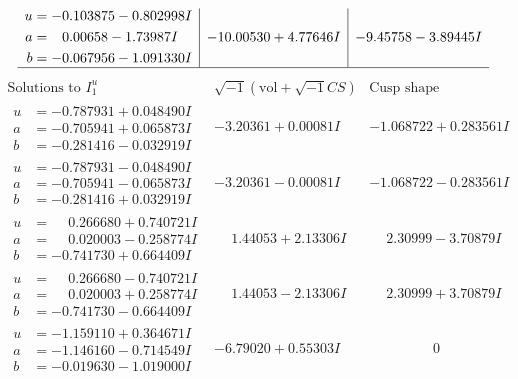 \documentclass[1p]{elsarticle_modified}
\theoremstyle{definition}
\newcommand{\I}{\sqrt{-1}}
\begin{document}
$$\begin{array}{c|c|c}
\begin{aligned}
u &= -0.103875 - 0.802998 I \\
a &= \phantom{-}0.00658 - 1.73987 I \\
b &= -0.067956 - 1.091330 I\end{aligned}
 & -10.00530 + 4.77646 I & -9.45758 - 3.89445 I\\
 \hline 
 \end{array}$$\newpage$$\begin{array}{c|c|c}  
\text{Solutions to }I^u_{1}& \I (\text{vol} + \sqrt{-1}CS) & \text{Cusp shape}\\
 \hline 
\begin{aligned}
u &= -0.787931 + 0.048490 I \\
a &= -0.705941 + 0.065873 I \\
b &= -0.281416 - 0.032919 I\end{aligned}
 & -3.20361 + 0.00081 I & -1.068722 + 0.283561 I \\ \hline\begin{aligned}
u &= -0.787931 - 0.048490 I \\
a &= -0.705941 - 0.065873 I \\
b &= -0.281416 + 0.032919 I\end{aligned}
 & -3.20361 - 0.00081 I & -1.068722 - 0.283561 I \\ \hline\begin{aligned}
u &= \phantom{-}0.266680 + 0.740721 I \\
a &= \phantom{-}0.020003 - 0.258774 I \\
b &= -0.741730 + 0.664409 I\end{aligned}
 & \phantom{-}1.44053 + 2.13306 I & \phantom{-}2.30999 - 3.70879 I \\ \hline\begin{aligned}
u &= \phantom{-}0.266680 - 0.740721 I \\
a &= \phantom{-}0.020003 + 0.258774 I \\
b &= -0.741730 - 0.664409 I\end{aligned}
 & \phantom{-}1.44053 - 2.13306 I & \phantom{-}2.30999 + 3.70879 I \\ \hline\begin{aligned}
u &= -1.159110 + 0.364671 I \\
a &= -1.146160 - 0.714549 I \\
b &= -0.019630 - 1.019000 I\end{aligned}
 & -6.79020 + 0.55303 I & \phantom{-0.000000 } 0 \\ \hline\begin{aligned}

\end{aligned}
\end{array}$$
\end{document}
